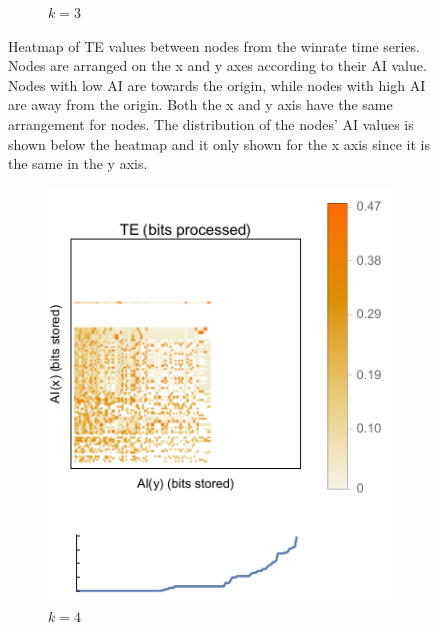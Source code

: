 \documentclass[twoside]{article}
\begin{document}
\begin{multicols}{2}
\begin{figure}
\begin{subfigure}{.5\textwidth}
  \caption{$k=3$}
  \label{fig:sub2}
\end{subfigure}
\caption{Heatmap of TE values between nodes from the winrate time series. Nodes are arranged on the x and y axes according to their AI value. Nodes with low AI are towards the origin, while nodes with high AI are away from the origin. Both the x and y axis have the same arrangement for nodes. The distribution of the nodes' AI values is shown below the heatmap and it only shown for the x axis since it is the same in the y axis.}
\label{fig:test}
\end{figure}

\begin{figure}
\centering
\begin{subfigure}{.5\textwidth}
  \centering
  \includegraphics[width=0.9\linewidth]{winrate_AI_vs_AI_vs_TE_Heatmap_k4.pdf}
  \caption{$k=4$}
  \label{fig:sub1}
\end{subfigure}%
\begin{subfigure}{.5\textwidth}
  \centering

\end{subfigure}
\end{figure}
\end{multicols}
\end{document}
